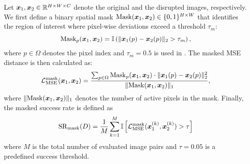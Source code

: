 \documentclass{article}
\begin{document}
Let ${\bm{x}}_1, {\bm{x}}_2 \in \mathbb{R}^{H \times W \times C}$ denote the original and the disrupted images, respectively. 
We first define a binary spatial mask $\mathrm{Mask}({\bm{x}}_1, {\bm{x}}_2) \in \{0, 1\}^{H \times W}$ that identifies the region of interest where pixel-wise deviations exceed a threshold $\tau_m$:
\begin{equation}
\mathrm{Mask}_{p}({\bm{x}}_1,{\bm{x}}_2) = \mathbb{I} \left( \| {\bm{x}}_1(p) - {\bm{x}}_2(p) \|_2 > \tau_m \right),
\end{equation}
where $p\in \Omega$ denotes the pixel index and $\tau_m = 0.5$ is used in \cite{huang2022cmua}. 
%
The masked MSE distance is then calculated as:
\begin{equation} 
\mathcal{L}_\mathrm{MSE}^{\text{mask}}({\bm{x}}_1, {\bm{x}}_2) = \frac{\sum_{p \in \Omega} \mathrm{Mask}_{p}({\bm{x}}_1,{\bm{x}}_2) \cdot \| {\bm{x}}_1(p) - {\bm{x}}_2(p) \|_2^2}{\|\mathrm{Mask}({\bm{x}}_1, {\bm{x}}_2)\|_1} , \label{eq:l2_mask} 
\end{equation}
\noindent where $\|\mathrm{Mask}({\bm{x}}_1, {\bm{x}}_2)\|_1$ denotes the number of active pixels in the mask.
Finally, the masked success rate is defined as
\begin{equation} 
\mathrm{SR}_{\mathrm{mask}}(D) = \frac{1}{M}\sum_{k=1}^{M} \mathbb{I}\left[\mathcal{L}_\mathrm{MSE}^{\mathrm{mask}}({\bm{x}}_1^{(k)}, {\bm{x}}_2^{(k)}) > \tau \right] \label{eq:sr_mask} \end{equation}
\noindent where $M$ is the total number of evaluated image pairs and $\tau = 0.05$ is a predefined success threshold.
\end{document}
